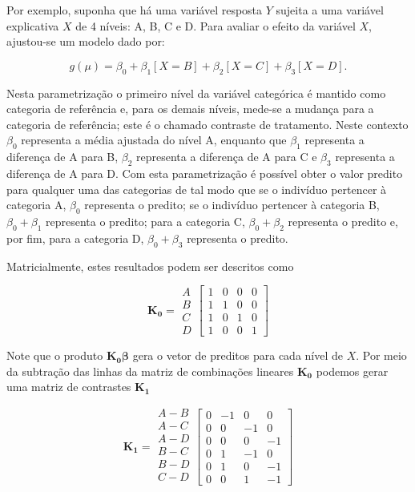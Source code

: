 Por exemplo, suponha que há uma variável resposta $Y$ sujeita a uma variável explicativa $X$ de 4 níveis: A, B, C e D. Para avaliar o efeito da variável $X$, ajustou-se um modelo dado por:

$$g(\mu) = \beta_0 + \beta_1[X=B] + \beta_2[X=C] + \beta_3[X=D].$$

\noindent Nesta parametrização o primeiro nível da variável categórica é mantido como categoria de referência e, para os demais níveis, mede-se a mudança para a categoria de referência; este é o chamado contraste de tratamento. Neste contexto $\beta_0$ representa a média ajustada do nível A, enquanto que $\beta_1$ representa a diferença de A para B, $\beta_2$ representa a diferença de A para C e $\beta_3$ representa a diferença de A para D. Com esta parametrização é possível obter o valor predito para qualquer uma das categorias de tal modo que se o indivíduo pertencer à categoria A, $\beta_0$ representa o predito; se o indivíduo pertencer à categoria B, $\beta_0 + \beta_1$ representa o predito; para a categoria C, $\beta_0 + \beta_2$ representa o predito e, por fim, para a categoria D, $\beta_0 + \beta_3$ representa o predito.

Matricialmente, estes resultados podem ser descritos como

$$
    \boldsymbol{K_0} = 
      \begin{matrix}
        A\\ 
        B\\ 
        C\\ 
        D 
      \end{matrix} 
    \begin{bmatrix}
      1 & 0 & 0 & 0\\ 
      1 & 1 & 0 & 0\\ 
      1 & 0 & 1 & 0\\ 
      1 & 0 & 0 & 1 
    \end{bmatrix}
$$

Note que o produto $\boldsymbol{K_0} \boldsymbol{\beta}$ gera o vetor de preditos para cada nível de $X$. Por meio da subtração das linhas da matriz de combinações lineares $\boldsymbol{K_0}$ podemos gerar uma matriz de contrastes $\boldsymbol{K_1}$

$$
    \boldsymbol{K_1} = 
      \begin{matrix}
        A-B\\ 
        A-C\\ 
        A-D\\ 
        B-C\\
        B-D\\
        C-D\\ 
      \end{matrix} 
    \begin{bmatrix}
      0 & -1 &  0 &  0\\ 
      0 &  0 & -1 &  0\\ 
      0 &  0 &  0 & -1\\ 
      0 &  1 & -1 &  0\\ 
      0 &  1 &  0 & -1\\ 
      0 &  0 &  1 & -1 
    \end{bmatrix}
$$

